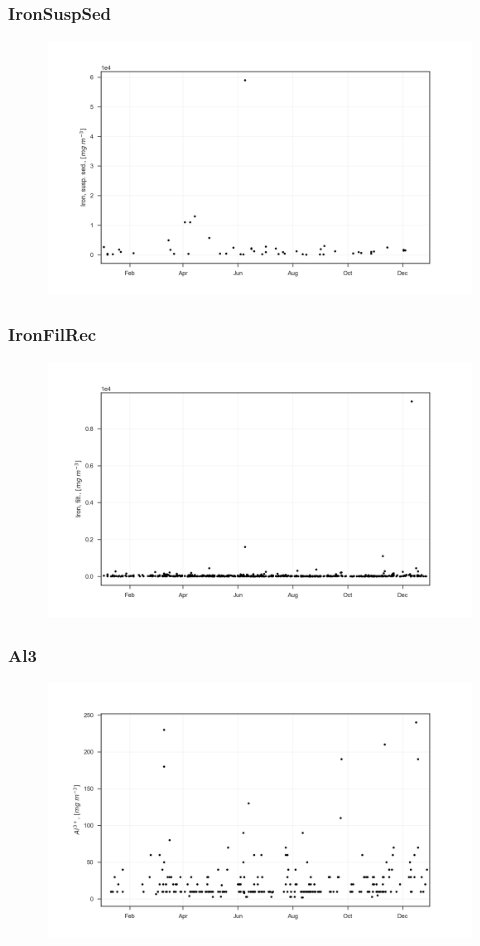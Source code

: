 \documentclass{beamer}
\begin{document}
\begin{frame}
\frametitle{IronSuspSed}
\begin{figure}
\includegraphics[width=\textwidth]{rivers/all/1yr_graph/IronSuspSed.png}
\end{figure}
\end{frame}

\begin{frame}
\frametitle{IronFilRec}
\begin{figure}
\includegraphics[width=\textwidth]{rivers/all/1yr_graph/IronFilRec.png}
\end{figure}
\end{frame}

\begin{frame}
\frametitle{Al3}
\begin{figure}
\includegraphics[width=\textwidth]{rivers/all/1yr_graph/Al3.png}
\end{figure}
\end{frame}
\end{document}
